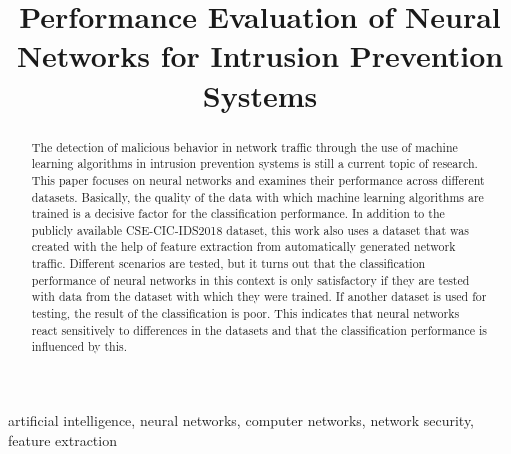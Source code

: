 \documentclass[conference]{IEEEtran}
\begin{document}
\title{Performance Evaluation of Neural Networks for Intrusion Prevention Systems}

\author{
\and
{}
}

\maketitle

\begin{abstract}
The detection of malicious behavior in network traffic through the use of machine learning algorithms in intrusion prevention systems is still a current topic of research. This paper focuses on neural networks and examines their performance across different datasets. Basically, the quality of the data with which machine learning algorithms are trained is a decisive factor for the classification performance. In addition to the publicly available CSE-CIC-IDS2018 dataset, this work also uses a dataset that was created with the help of feature extraction from automatically generated network traffic. Different scenarios are tested, but it turns out that the classification performance of neural networks in this context is only satisfactory if they are tested with data from the dataset with which they were trained. If another dataset is used for testing, the result of the classification is poor. This indicates that neural networks react sensitively to differences in the datasets and that the classification performance is influenced by this.
\end{abstract}

\begin{IEEEkeywords}
artificial intelligence, neural networks, computer networks, network security, feature extraction
\end{IEEEkeywords}
\end{document}
